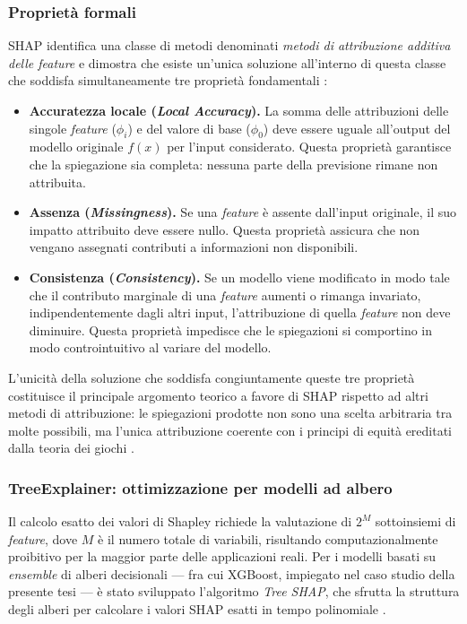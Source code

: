\subsubsection{Proprietà formali}

SHAP identifica una classe di metodi denominati \textit{metodi di attribuzione additiva delle feature} e dimostra che esiste un'unica soluzione all'interno di questa classe che soddisfa simultaneamente tre proprietà fondamentali \cite{lundberg2017unified}:

\begin{itemize}
    \item \textbf{Accuratezza locale (\textit{Local Accuracy}).} La somma delle attribuzioni delle singole \textit{feature} ($\phi_i$) e del valore di base ($\phi_0$) deve essere uguale all'output del modello originale $f(x)$ per l'input considerato. Questa proprietà garantisce che la spiegazione sia completa: nessuna parte della previsione rimane non attribuita.
    \item \textbf{Assenza (\textit{Missingness}).} Se una \textit{feature} è assente dall'input originale, il suo impatto attribuito deve essere nullo. Questa proprietà assicura che non vengano assegnati contributi a informazioni non disponibili.
    \item \textbf{Consistenza (\textit{Consistency}).} Se un modello viene modificato in modo tale che il contributo marginale di una \textit{feature} aumenti o rimanga invariato, indipendentemente dagli altri input, l'attribuzione di quella \textit{feature} non deve diminuire. Questa proprietà impedisce che le spiegazioni si comportino in modo controintuitivo al variare del modello.
\end{itemize}

L'unicità della soluzione che soddisfa congiuntamente queste tre proprietà costituisce il principale argomento teorico a favore di SHAP rispetto ad altri metodi di attribuzione: le spiegazioni prodotte non sono una scelta arbitraria tra molte possibili, ma l'unica attribuzione coerente con i principi di equità ereditati dalla teoria dei giochi \cite{lundberg2017unified}.

\subsubsection{TreeExplainer: ottimizzazione per modelli ad albero}

Il calcolo esatto dei valori di Shapley richiede la valutazione di $2^M$ sottoinsiemi di \textit{feature}, dove $M$ è il numero totale di variabili, risultando computazionalmente proibitivo per la maggior parte delle applicazioni reali. Per i modelli basati su \textit{ensemble} di alberi decisionali --- fra cui XGBoost, impiegato nel caso studio della presente tesi --- è stato sviluppato l'algoritmo \textit{Tree SHAP}, che sfrutta la struttura degli alberi per calcolare i valori SHAP esatti in tempo polinomiale \cite{lundberg2019explainable}.

